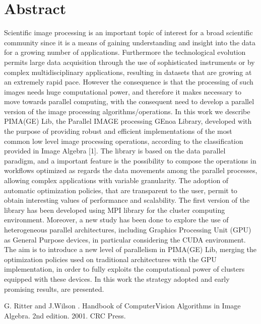 \documentclass[article, A4, 11pt]{llncs}%
\begin{document}
\section*{Abstract}
Scientific image processing is an important topic of interest for a broad scientific community since it is a means of gaining understanding and insight into the data for a growing number of applications. Furthermore the technological evolution permits large data acquisition through the use of sophisticated instruments or by complex multidisciplinary applications, resulting in datasets that are growing at an extremely rapid pace. However the consequence is that the processing of such images needs huge computational power, and therefore it makes necessary to move towards parallel computing, with the consequent need to develop a parallel version of the image processing algorithms/operations. 
In this work we describe PIMA(GE) Lib, the Parallel IMAGE processing GEnoa Library, developed with the purpose of providing robust and efficient implementations of the most common low level image processing operations, according to the classification provided in Image Algebra [1]. The library is based on the data parallel paradigm, and a important feature is the possibility to compose the operations in workflows optimized as regards the data movements among the parallel processes, allowing complex applications with variable granularity. The adoption of automatic optimization policies, that are transparent to the user, permit to obtain interesting values of performance and scalability.  The first version of the library has been developed using MPI library for the cluster computing environment. 
Moreover, a new study has been done to explore the use of heterogeneous parallel architectures, including Graphics Processing Unit (GPU) as General Purpose devices, in particular considering the CUDA environment. The aim is to introduce a  new level of parallelism in PIMA(GE) Lib, merging the optimization policies used on traditional architectures with the GPU implementation, in order to fully exploits the computational power of clusters equipped with these devices.  In this work the strategy adopted and early promising results, are presented. 



\begin{thebibliography}{10}
{\sc G. Ritter and J.Wilson }. {Handbook of ComputerVision Algorithms in Image Algebra}. 2nd edition. 2001. CRC Press.
\end{thebibliography} %
\end{document}

